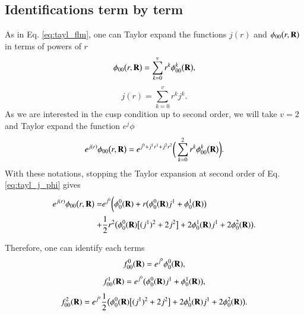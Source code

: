 \documentclass[aip,jcp,reprint,noshowkeys,superscriptaddress]{revtex4-1}
\newcommand{\bd}[1]{{\bf {#1}}}
\begin{document}
\subsection{Identifications term by term}
As in Eq. \eqref{eq:tayl_flm}, one can Taylor expand the functions $j(r)$ and $\phi_{00}\big(r,\bd{R}\big)$ in terms of powers of $r$
\begin{equation}
 \label{eq:tayl_phi00}
 \phi_{00}\big(r,\bd{R}\big)  = \sum_{k=0}^v r^k \phi_{00}^k\big(\bd{R}\big), 
\end{equation}
\begin{equation}
 \label{eq:tayl_j}
 j(r) = \sum_{k=0}^v r^k j^k.  
\end{equation}
As we are interested in the cusp condition up to second order, we will take $v=2$ and Taylor expand the function $e^j\phi$
\begin{equation}
 \label{eq:tayl_j_phi}
  e^{j(r)}\phi_{00}\big(r,\bd{R}\big) = e^{j^0 + j^1 r^1 + j^2 r^2}\bigg( \sum_{k=0}^2 r^k \phi_{00}^k\big(\bd{R}\big) \bigg). 
\end{equation}
With these notations, stopping the Taylor expansion at second order of Eq. \eqref{eq:tayl_j_phi} gives
\begin{equation}
 \begin{aligned}
 e^{j(r)}\phi_{00}\big(r,\bd{R}\big) = & e^{j^0}\bigg(\phi_0^0(\bd{R}) + r \big(\phi_0^0(\bd{R}) j^1 + \phi_0^1(\bd{R})\big) \\
 +& \frac{1}{2} r^2\big(\phi_0^0(\bd{R}) \big[ (j^1)^2 + 2j^2 \big] + 2 \phi_0^1(\bd{R}) j^1 + 2 \phi_0^2(\bd{R}) \big).  
 \end{aligned}
\end{equation}

Therefore, one can identify each terms
\begin{equation}
 \label{eq:f0_jphi}
 f_{00}^0(\bd{R}) = e^{j^0} \phi_0^0(\bd{R}),
\end{equation}
\begin{equation}
 \label{eq:f1_jphi}
 f_{00}^1(\bd{R}) = e^{j^0}\big(\phi_0^0(\bd{R}) j^1 + \phi_0^1(\bd{R})\big),
\end{equation}
\begin{equation}
 \label{eq:f2_jphi}
 f_{00}^2(\bd{R}) = e^{j^0}\frac{1}{2}\big(\phi_0^0(\bd{R}) \big[ (j^1)^2 + 2j^2 \big] + 2 \phi_0^1(\bd{R}) j^1 + 2 \phi_0^2(\bd{R}) \big).
\end{equation}
\end{document}
